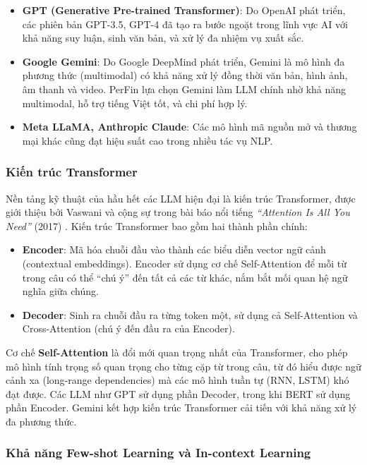 \begin{itemize}
    \item \textbf{GPT (Generative Pre-trained Transformer)}: Do OpenAI phát triển, các phiên bản GPT-3.5, GPT-4 đã tạo ra bước ngoặt trong lĩnh vực AI với khả năng suy luận, sinh văn bản, và xử lý đa nhiệm vụ xuất sắc.
    \item \textbf{Google Gemini}: Do Google DeepMind phát triển, Gemini là mô hình đa phương thức (multimodal) có khả năng xử lý đồng thời văn bản, hình ảnh, âm thanh và video. PerFin lựa chọn Gemini làm LLM chính nhờ khả năng multimodal, hỗ trợ tiếng Việt tốt, và chi phí hợp lý.
    \item \textbf{Meta LLaMA, Anthropic Claude}: Các mô hình mã nguồn mở và thương mại khác cũng đạt hiệu suất cao trong nhiều tác vụ NLP.
\end{itemize}

\subsubsection{Kiến trúc Transformer}

Nền tảng kỹ thuật của hầu hết các LLM hiện đại là kiến trúc Transformer, được giới thiệu bởi Vaswani và cộng sự trong bài báo nổi tiếng \textit{``Attention Is All You Need''} (2017) \cite{ref11}. Kiến trúc Transformer bao gồm hai thành phần chính:

\begin{itemize}
    \item \textbf{Encoder}: Mã hóa chuỗi đầu vào thành các biểu diễn vector ngữ cảnh (contextual embeddings). Encoder sử dụng cơ chế Self-Attention để mỗi từ trong câu có thể ``chú ý'' đến tất cả các từ khác, nắm bắt mối quan hệ ngữ nghĩa giữa chúng.
    \item \textbf{Decoder}: Sinh ra chuỗi đầu ra từng token một, sử dụng cả Self-Attention và Cross-Attention (chú ý đến đầu ra của Encoder).
\end{itemize}

Cơ chế \textbf{Self-Attention} là đổi mới quan trọng nhất của Transformer, cho phép mô hình tính trọng số quan trọng cho từng cặp từ trong câu, từ đó hiểu được ngữ cảnh xa (long-range dependencies) mà các mô hình tuần tự (RNN, LSTM) khó đạt được. Các LLM như GPT sử dụng phần Decoder, trong khi BERT sử dụng phần Encoder. Gemini kết hợp kiến trúc Transformer cải tiến với khả năng xử lý đa phương thức.

\subsubsection{Khả năng Few-shot Learning và In-context Learning}

